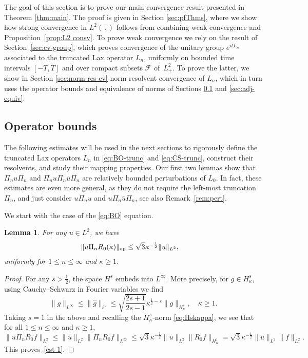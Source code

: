 \documentclass [11pt] {article}
\newtheorem{lem}[thm]{Lemma}
\newcommand{\<}{\langle}
\renewcommand{\>}{\rangle}
\newcommand{\wh}[1]{\widehat{#1}}
\newcommand{\op}{\textup{op}}
\begin{document}
The goal of this section is to prove our main convergence result presented in Theorem \ref{thm:main}. The proof is given in Section \ref{sec:pfThms}, where we show how strong convergence in $L^2(\mathbb{T})$ follows from combining weak convergence and Proposition~\ref{prop:L2 consv}.
To prove weak convergence we rely on the result of Section~\ref{sec:cv-group}, which proves convergence of the unitary group $e^{itL_n}$ associated to the truncated Lax operator $L_n$, uniformly on bounded time intervals $[-T,T]$ and over compact subsets $\mathcal{F}$ of~$ L^2_{+}$. To prove the latter, we show in Section \ref{sec:norm-res-cv} norm resolvent convergence of $L_n$, which in turn uses the operator bounds and equivalence of norms of Sections \ref{sec:op-bds} and \ref{sec:adj-equiv}.

\subsection{Operator bounds}\label{sec:op-bds}

The following estimates will be used in the next sections to rigorously define the truncated Lax operators $L_n$ in \eqref{eq:BO-trunc} and \eqref{eq:CS-trunc}, construct their resolvents, and study their mapping properties.  Our first two lemmas show that $\Pi_n u \Pi_n$ and $\Pi_n u \Pi_n \overline{u} \Pi_n $ are relatively bounded perturbations of $L_0$.  In fact, these estimates are even more general, as they do not require the left-most truncation $\Pi_n$, and just consider $u\Pi_n u$ and $u\Pi_n \bar{u} \Pi_n$, see also  Remark~\ref{rem:pert}. 

We start with the case of the \eqref{eq:BO} equation.
\begin{lem}
For any $u\in L^2$, we have
\begin{align}
\| u\Pi_n R_0(\kappa) \|_{\op} &\le\sqrt3 \kappa^{-\frac12} \|u\|_{L^2},
\label{est 1}
\end{align}
uniformly for $1\leq n\leq \infty$ and $\kappa\geq 1$.
\end{lem}
\begin{proof}
For any $s>\frac12$, the space $H^s$ embeds into $L^\infty$.  More precisely, for $g \in H^s_\kappa$, using Cauchy--Schwarz in Fourier variables we find
\begin{equation}
\|g\|_{L^\infty} \leq \|\wh{g}\|_{\ell^1} \leq \sqrt{\frac{2s +1}{2s-1}} \kappa^{\frac12 - s} \|g\|_{H^s_\kappa}, \quad \kappa\geq 1.
\label{est 1p1}
\end{equation}
%
Taking $s=1$ in the above and recalling the $H^s_{\kappa}$-norm \eqref{eq:Hskappa}, we see that for all $1\leq n\leq \infty$ and $\kappa\geq 1$,
\begin{equation*}
\|u\Pi_n R_0f \|_{L^2} 
\leq \|u\|_{L^2} \|\Pi_n R_0f \|_{L^\infty}
\le\sqrt3 \kappa^{-\frac12} \|u\|_{L^2} \|R_0f\|_{H^1_\kappa}
= \sqrt3\kappa^{-\frac12} \|u\|_{L^2} \|f\|_{L^2} .
\end{equation*}
This proves~\eqref{est 1}.
\end{proof}
\end{document}
